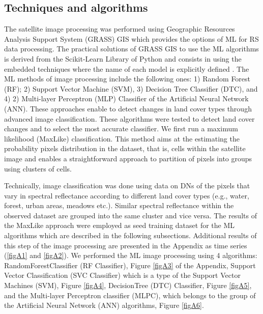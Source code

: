 \documentclass[remotesensing,article,submit,pdftex,moreauthors]{Definitions/mdpi}
\begin{document}
\subsection{Techniques and algorithms}

The satellite image processing was performed using Geographic Resources Analysis Support System (GRASS) GIS which provides the options of ML for RS data processing. The practical solutions of GRASS GIS to use the ML algorithms is derived from the Scikit-Learn Library of Python \cite{scikitlearn} and consists in using the embedded techniques where the name of each model is explicitly defined \cite{LEMENKOVA2025100180}. The ML methods of image processing include the following ones: 1) Random Forest (RF); 2) Support Vector Machine (SVM), 3) Decision Tree Classifier (DTC), and 4) 2) Multi-layer Perceptron (MLP) Classifier of the Artificial Neural Network (ANN). {These} approaches enable to detect changes in land cover types {through advanced image classification}. These algorithms were tested to detect land cover changes {and to select the most accurate classifier}. {We first run a maximum likelihood (MaxLike) classification. This method aims at the estimating the probability pixels distribution in the dataset, that is, cells within the satellite image and enables a straightforward approach to partition of pixels into groups using clusters of cells}. 

Technically, {image classification was} done using data on DNs of the pixels that {vary in spectral reflectance} according to different land cover types (e.g., water, forest, urban areas, meadows etc{.)}. Similar spectral reflectance within the observed dataset are grouped into the same cluster and vice versa. The results of the MaxLike approach were employed as seed training dataset for the ML algorithms which are described in the following subsections{. }Additional results of this step of the image processing are presented in the Appendix as time series (\ref{figA1} and \ref{figA2}). {We performed the ML image processing using 4 algorithms:} RandomForestClassifier (RF Classifier){, }Figure \ref{figA3} of the Appendix{, }Support Vector Classification (SVC Classifier) {which }is a type of the Support Vector Machines (SVM){, } Figure \ref{figA4}{, }DecisionTree (DTC) Classifier{, Figure} \ref{figA5}{, and }the Multi-layer Perceptron classifier (MLPC){, which  belongs to the group of the Artificial Neural Network (ANN) algorithms}, Figure \ref{figA6}.

\end{document}
